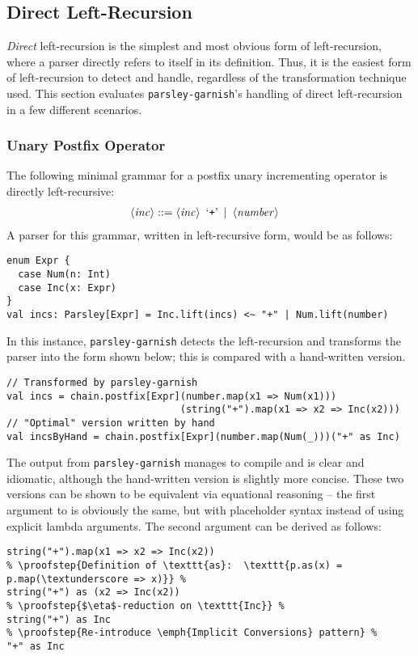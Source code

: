 \documentclass[../../main.tex]{subfiles}
\begin{document}
\subsection{Direct Left-Recursion}
\emph{Direct} left-recursion is the simplest and most obvious form of left-recursion, where a parser directly refers to itself in its definition.
Thus, it is the easiest form of left-recursion to detect and handle, regardless of the transformation technique used.
This section evaluates \texttt{parsley-garnish}'s handling of direct left-recursion in a few different scenarios.

\subsubsection{Unary Postfix Operator}
The following minimal grammar for a postfix unary incrementing operator is directly left-recursive:
\begin{align*}
\langle \mathit{inc} \rangle &::= \langle \mathit{inc} \rangle \enspace \text{`\texttt{+}'} \enspace | \enspace \langle \mathit{number} \rangle
\end{align*}
%
A parser for this grammar, written in left-recursive form, would be as follows:
\begin{verbatim}
enum Expr {
  case Num(n: Int)
  case Inc(x: Expr)
}
val incs: Parsley[Expr] = Inc.lift(incs) <~ "+" | Num.lift(number)
\end{verbatim}
%
In this instance, \texttt{parsley-garnish} detects the left-recursion and transforms the parser into the form shown below; this is compared with a hand-written version.
\begin{verbatim}
// Transformed by parsley-garnish
val incs = chain.postfix[Expr](number.map(x1 => Num(x1)))
                              (string("+").map(x1 => x2 => Inc(x2)))
// "Optimal" version written by hand
val incsByHand = chain.postfix[Expr](number.map(Num(_)))("+" as Inc)
\end{verbatim}
%
The output from \texttt{parsley-garnish} manages to compile and is clear and idiomatic, although the hand-written version is slightly more concise.
These two versions can be shown to be equivalent via equational reasoning --
the first argument to  is obviously the same, but with placeholder syntax instead of using explicit lambda arguments.
The second argument can be derived as follows:
\begin{verbatim}
string("+").map(x1 => x2 => Inc(x2))
% \proofstep{Definition of \texttt{as}:  \texttt{p.as(x) = p.map(\textunderscore => x)}} %
string("+") as (x2 => Inc(x2))
% \proofstep{$\eta$-reduction on \texttt{Inc}} %
string("+") as Inc
% \proofstep{Re-introduce \emph{Implicit Conversions} pattern} %
"+" as Inc
\end{verbatim}
\end{document}
